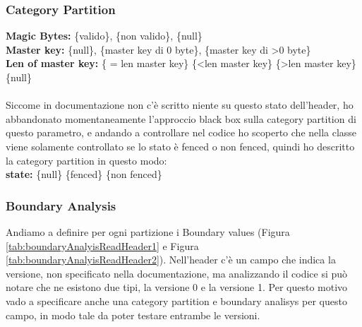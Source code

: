 \documentclass[10pt, a4paper]{article}
\begin{document}
\subsubsection{Category Partition}
\textbf{Magic Bytes:} \{valido\}, \{non valido\}, \{null\} \\
\textbf{Master key:} \{null\}, \{master key di 0 byte\}, \{master key di \textgreater 0 byte\} \\
\textbf{Len of master key:} \{ = len master key\} \{\textless len master key\} \{\textgreater len master key\} \{null\} \\ \\
Siccome in documentazione non c'è scritto niente su questo stato dell'header, ho abbandonato momentaneamente
l'approccio black box sulla category partition di questo parametro, e andando a controllare nel codice
ho scoperto che nella classe viene solamente controllato se lo stato è fenced o non fenced, quindi ho descritto 
la category partition in questo modo: \\
\textbf{state:} \{null\} \{fenced\} \{non fenced\} \\


\subsubsection{Boundary Analysis}
Andiamo a definire per ogni partizione i Boundary values (Figura \ref{tab:boundaryAnalyisReadHeader1} e Figura \ref{tab:boundaryAnalyisReadHeader2}). 
Nell'header c'è un campo che indica la versione, non specificato nella documentazione, ma
analizzando il codice si può notare che ne esistono due tipi, la versione 0 e la versione 1. Per questo motivo
vado a specificare anche una category partition e boundary analisys per questo campo, in modo tale da poter testare entrambe le versioni. \\
\end{document}
